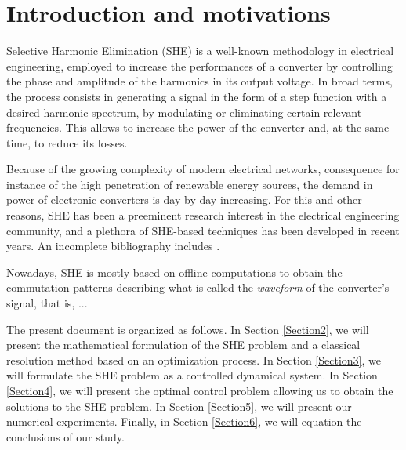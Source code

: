 
\section{Introduction and motivations} 

Selective Harmonic Elimination (SHE) \cite{Rodriguez2002} is a well-known methodology in electrical engineering, employed to increase the performances of a converter by controlling the phase and amplitude of the harmonics in its output voltage. In broad terms, the process consists in generating a signal in the form of a step function with a desired harmonic spectrum, by modulating or eliminating certain relevant frequencies. This allows to increase the power of the converter and, at the same time, to reduce its losses.  

Because of the growing complexity of modern electrical networks, consequence for instance of the high penetration of renewable energy sources, the demand in power of electronic converters is day by day increasing. For this and other reasons, SHE has been a preeminent research interest in the electrical engineering community, and a plethora of SHE-based techniques has been developed in recent years. An incomplete bibliography includes \cite{duranay2017selective,Janabi2020,Yang2017}.   

Nowadays, SHE is mostly based on offline computations to obtain the commutation patterns describing what is called the \textit{waveform} of the converter's signal, that is, ...




The present document is organized as follows. In Section \ref{Section2}, we will present the mathematical formulation of the SHE problem and a classical resolution method based on an optimization process. In Section \ref{Section3}, we will formulate the SHE problem as a controlled dynamical system. In Section \ref{Section4}, we will present the optimal control problem allowing us to obtain the solutions to the SHE problem. In Section \ref{Section5}, we will present our numerical experiments. Finally, in Section \ref{Section6}, we will equation the conclusions of our study. 
